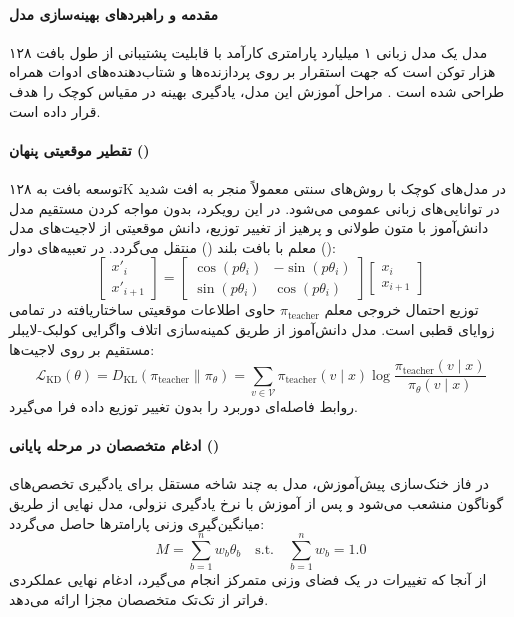 \item {}

\paragraph*{مقدمه و راهبردهای بهینه‌سازی مدل }
مدل  یک مدل زبانی ۱ میلیارد پارامتری کارآمد با قابلیت پشتیبانی از طول بافت ۱۲۸ هزار توکن است که جهت استقرار بر روی پردازنده‌ها و شتاب‌دهنده‌های ادوات همراه طراحی شده است \cite{huber2025mobilellmpro}. مراحل آموزش این مدل، یادگیری بهینه در مقیاس کوچک را هدف قرار داده است.

\paragraph*{تقطیر موقعیتی پنهان ()}
توسعه بافت به ۱۲۸K در مدل‌های کوچک با روش‌های سنتی معمولاً منجر به افت شدید در توانایی‌های زبانی عمومی می‌شود. در این رویکرد، بدون مواجه کردن مستقیم مدل دانش‌آموز با متون طولانی و پرهیز از تغییر توزیع، دانش موقعیتی از لاجیت‌های مدل معلم با بافت بلند () منتقل می‌گردد. در تعبیه‌های دوار ():
\begin{equation}
    \begin{bmatrix} x'_i \\ x'_{i+1} \end{bmatrix} = \begin{bmatrix} \cos(p \theta_i) & -\sin(p \theta_i) \\ \sin(p \theta_i) & \cos(p \theta_i) \end{bmatrix} \begin{bmatrix} x_i \\ x_{i+1} \end{bmatrix}
\end{equation}
توزیع احتمال خروجی معلم $\pi_{\text{teacher}}$ حاوی اطلاعات موقعیتی ساختاریافته در تمامی زوایای قطبی است. مدل دانش‌آموز از طریق کمینه‌سازی اتلاف واگرایی کولبک-لایبلر مستقیم بر روی لاجیت‌ها:
\begin{equation}
    \mathcal{L}_{\text{KD}}(\theta) = D_{\text{KL}}(\pi_{\text{teacher}} \parallel \pi_\theta) = \sum_{v \in \mathcal{V}} \pi_{\text{teacher}}(v \mid x) \log \frac{\pi_{\text{teacher}}(v \mid x)}{\pi_\theta(v \mid x)}
\end{equation}
روابط فاصله‌ای دوربرد را بدون تغییر توزیع داده فرا می‌گیرد.

\paragraph*{ادغام متخصصان در مرحله پایانی ()}
در فاز خنک‌سازی پیش‌آموزش، مدل به چند شاخه مستقل برای یادگیری تخصص‌های گوناگون منشعب می‌شود و پس از آموزش با نرخ یادگیری نزولی، مدل نهایی از طریق میانگین‌گیری وزنی پارامترها حاصل می‌گردد:
\begin{equation}
    M = \sum_{b=1}^n w_b \theta_b \quad \text{s.t.} \quad \sum_{b=1}^n w_b = 1.0
\end{equation}
از آنجا که تغییرات در یک فضای وزنی متمرکز انجام می‌گیرد، ادغام نهایی عملکردی فراتر از تک‌تک متخصصان مجزا ارائه می‌دهد.

